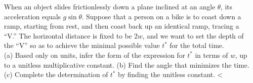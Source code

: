 When an object slides frictionlessly down a plane inclined at an angle
$\theta$, its acceleration equals $g\sin\theta$.
Suppose that a person on a bike is to coast down a ramp, starting from
rest, and then coast back up an identical ramp, tracing a ``V.'' The
horizontal distance is fixed to be $2w$, and we want to set the depth of the ``V'' so as to
achieve the minimal possible value $t^*$ for the total time.\\
(a) Based only on units, infer the form of the expression for $t^*$ in terms
of $w$, up to a unitless multiplicative constant.\hwendpart
(b) Find the angle that minimizes the time.\hwendpart
(c) Complete the determination of $t^*$ by finding the unitless constant.
<%
